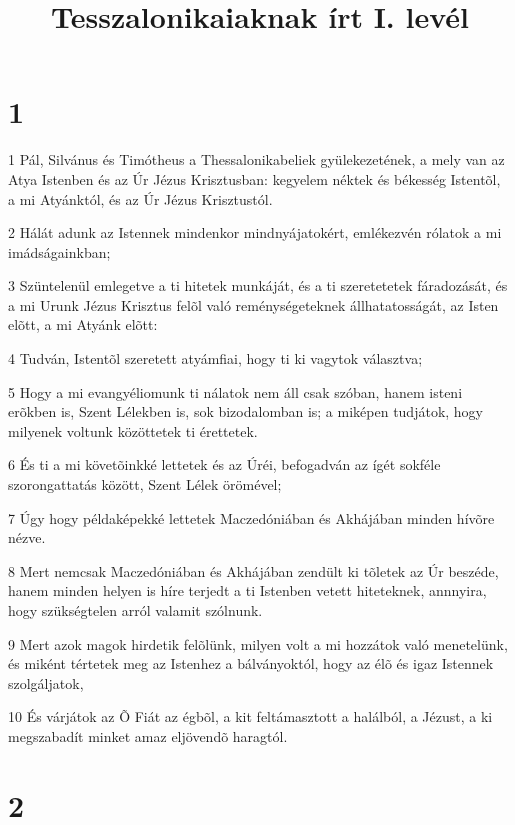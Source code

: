 

\title{Tesszalonikaiaknak írt I. levél}


\chapter{1}

\par 1 Pál, Silvánus és Timótheus a Thessalonikabeliek gyülekezetének, a mely van az Atya Istenben és az Úr Jézus Krisztusban: kegyelem néktek és békesség Istentõl, a mi Atyánktól, és az Úr Jézus Krisztustól.
\par 2 Hálát adunk az Istennek mindenkor mindnyájatokért, emlékezvén rólatok a mi imádságainkban;
\par 3 Szüntelenül emlegetve a ti hitetek munkáját, és a ti szeretetetek fáradozását, és a mi Urunk Jézus Krisztus felõl való reménységeteknek állhatatosságát, az Isten elõtt, a mi Atyánk elõtt:
\par 4 Tudván, Istentõl szeretett atyámfiai, hogy ti ki vagytok választva;
\par 5 Hogy a mi evangyéliomunk ti nálatok nem áll csak szóban, hanem isteni erõkben is, Szent Lélekben is, sok bizodalomban is; a miképen tudjátok, hogy milyenek voltunk közöttetek ti érettetek.
\par 6 És ti a mi követõinkké lettetek és az Úréi, befogadván az ígét sokféle szorongattatás között, Szent Lélek örömével;
\par 7 Úgy hogy példaképekké lettetek Maczedóniában és Akhájában minden hívõre nézve.
\par 8 Mert nemcsak Maczedóniában és Akhájában zendült ki tõletek az Úr beszéde, hanem minden helyen is híre terjedt a ti Istenben vetett hiteteknek, annnyira, hogy szükségtelen arról valamit szólnunk.
\par 9 Mert azok magok hirdetik felõlünk, milyen volt a mi hozzátok való menetelünk, és miként tértetek meg az Istenhez a bálványoktól, hogy az élõ és igaz Istennek szolgáljatok,
\par 10 És várjátok az Õ Fiát az égbõl, a kit feltámasztott a halálból, a Jézust, a ki megszabadít minket amaz eljövendõ haragtól.

\chapter{2}

